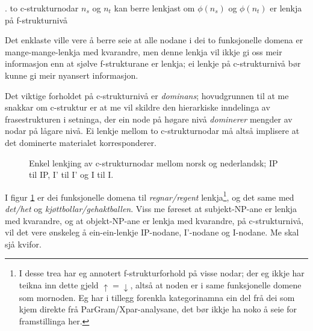 \documentclass[11pt,a4paper,oneside,draft]{book}
\newcommand{\proj}[2]{\begin{tabular}{c}\footnotesize{#1}\\\normalsize{#2}\end{tabular}}
\newcommand{\ua}{\ensuremath{\uparrow}}
\newcommand{\da}{\ensuremath{\downarrow}}
\begin{document}
\ex.\label{krav:subnode-f-lenkja} to c-strukturnodar $n_s$ og $n_t$ kan
     berre lenkjast om $\phi(n_s)$ og $\phi(n_t)$ er lenkja på
     f-strukturnivå

Det enklaste ville vere å berre seie at alle nodane i dei to
funksjonelle domena er mange-mange-lenkja med kvarandre, men denne
lenkja vil ikkje gi oss meir informasjon enn at sjølve f-strukturane
er lenkja; ei lenkje på c-strukturnivå bør kunne gi meir nyansert
informasjon.

Det viktige forholdet på c-strukturnivå er \emph{dominans}; hovudgrunnen
til at me snakkar om c-struktur er at me vil skildre den hierarkiske
inndelinga av frasestrukturen i setninga, der ein node på høgare nivå
\emph{dominerer} mengder av nodar på lågare nivå. Ei lenkje mellom to
c-strukturnodar må altså implisere at det dominerte materialet
korresponderer.


\begin{figure}[htp]
\centering
   \caption{Enkel lenkjing av c-strukturnodar mellom norsk og
   nederlandsk; IP til IP, I' til I' og I til I.}
   \label{fig:enkel-c-lenkje}
  \end{figure}

I figur \ref{fig:enkel-c-lenkje} er dei funksjonelle domena til \emph{regnar/regent} 
lenkja\footnote{I desse trea har eg annotert f-strukturforhold på visse nodar;
       der eg ikkje har teikna inn dette gjeld $\ua=\da$, altså at
       noden er i same funksjonelle domene som mornoden. Eg har i
       tillegg forenkla kategorinamna ein del frå dei som kjem direkte
       frå ParGram/Xpar-analysane, det bør ikkje ha noko å seie for
       framstillinga her. }, og det same med \emph{det/het} og \emph{kjøttbollar/gehaktballen}. 
Viss me føreset at subjekt-NP-ane er lenkja med kvarandre, og at
objekt-NP-ane er lenkja med kvarandre, på c-strukturnivå,
vil det vere ønskeleg å ein-ein-lenkje IP-nodane, I'-nodane og
I-nodane. Me skal sjå kvifor.
\end{document}
